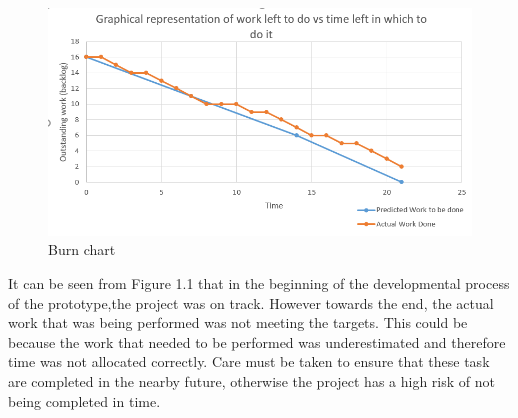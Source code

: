 \documentclass[paper=a4, fontsize=11pt]{scrartcl} %
\numberwithin{equation}{section} %
\numberwithin{figure}{section} %
\numberwithin{table}{section} %
\begin{document}
\begin{figure}[hbt!]
\centering
\includegraphics[width=5in]{chart.png}
\caption{Burn chart}
\label{burn down chart of prototype}
\end{figure}

It can be seen from Figure 1.1 that in the beginning of the developmental process of the prototype,the project was on track. However towards the end, the actual work that was being performed was not meeting the targets. This could be because the work that needed to be performed was underestimated and therefore time was not allocated correctly. Care must be taken to ensure that these task are completed in the nearby future, otherwise the project has a high risk of not being completed in time. 
\end{document}
